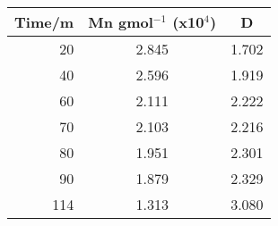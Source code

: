 \begin{tabular}[b]{rcc}
\toprule
 Time/m &  Mn gmol$^{-1}$ (x10$^4$) &     D \\
\midrule
     20 &                     2.845 & 1.702 \\
     40 &                     2.596 & 1.919 \\
     60 &                     2.111 & 2.222 \\
     70 &                     2.103 & 2.216 \\
     80 &                     1.951 & 2.301 \\
     90 &                     1.879 & 2.329 \\
    114 &                     1.313 & 3.080 \\
\bottomrule
\end{tabular}
